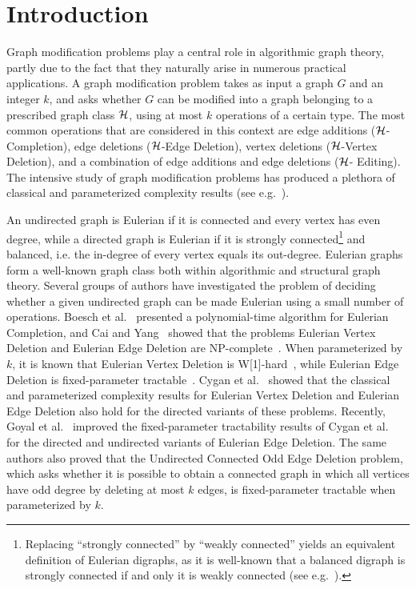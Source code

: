 \documentclass[11pt]{llncs}
\newcommand{\NP}{{\sf NP}}
\newcommand{\W}{{\sf W[1]}}
\begin{document}
\section{Introduction}\label{sec:intro}
Graph modification problems play a central role in algorithmic graph theory,
partly due to the fact that they naturally arise in numerous practical
applications. A graph modification problem takes as input a graph $G$ and an
integer $k$, and asks whether $G$ can be modified into a graph
belonging to a prescribed graph class ${\cal H}$, using at most $k$ operations
of a certain type. The most common operations that are considered in this
context are edge additions (${\cal H}$-{\sc Completion}), edge deletions
(${\cal H}$-{\sc Edge Deletion}), vertex deletions (${\cal H}$-{\sc Vertex Deletion}),
and a combination of edge additions and edge deletions (${\cal H}$-{\sc
Editing}). The intensive study of graph modification problems has produced a
plethora of classical and parameterized complexity results (see
e.g.~\cite{BoeschST77,BurzynBD06,Ca96,CaiY11,CechlarovaS10,CrowstonGJY12,CyganMPPS14,DornMNW13,FroeseNN14,GoyalMPPS14,Golovach13,Golovach13a,HohnJM12,LesniakO86,LY80,MathiesonS12,MoserT09,NatanzonSS01}).


An undirected graph is Eulerian if it is connected and every vertex has even
degree,
while 
a directed graph is Eulerian if it is strongly
connected\footnote{Replacing ``strongly connected'' by ``weakly connected''
yields an equivalent definition of Eulerian digraphs, as it is well-known that
a balanced digraph is strongly connected if and only it is weakly connected
(see e.g.~\cite{CyganMPPS14}).} and balanced, i.e. the in-degree of every
vertex equals its out-degree. Eulerian graphs form a well-known graph class
both within algorithmic and structural graph theory. 
Several groups of authors have investigated the problem of deciding 
whether
a given undirected graph can be made Eulerian using a small number of operations. Boesch et
al.~\cite{BoeschST77} presented a polynomial-time algorithm for {\sc Eulerian
Completion}, and 
Cai and Yang~\cite{CaiY11} showed that the problems {\sc
Eulerian Vertex Deletion} and {\sc Eulerian Edge Deletion} are
\NP-complete~\cite{CaiY11}. When parameterized by~$k$, 
it is known that
{\sc Eulerian Vertex Deletion} is \W-hard~\cite{CaiY11}, while {\sc
Eulerian Edge Deletion} is fixed-parameter tractable~\cite{CyganMPPS14}. Cygan
et al.~\cite{CyganMPPS14} showed that the classical and parameterized
complexity results for {\sc Eulerian Vertex Deletion} and {\sc Eulerian Edge
Deletion} also hold for the directed variants of these problems.
Recently, Goyal et al.~\cite{GoyalMPPS14} improved the fixed-parameter tractability  results of Cygan et al.~\cite{CyganMPPS14} for the directed and undirected variants 
of {\sc Eulerian Edge
Deletion}. The same authors also proved that the {\sc Undirected Connected Odd Edge Deletion} problem, which asks whether it is possible to obtain a connected graph in which all vertices have odd degree by deleting at most $k$ edges, is fixed-parameter tractable when parameterized by $k$.
\end{document}
